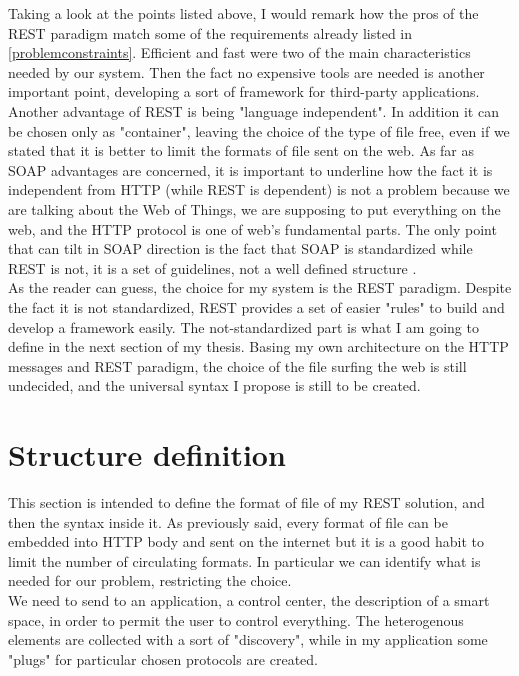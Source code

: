 Taking a look at the points listed above, I would remark how the pros of the REST paradigm match some of the requirements already listed in \ref{problemconstraints}. Efficient and fast were two of the main characteristics needed by our system. Then the fact no expensive tools are needed is another important point, developing a sort of framework for third-party applications. Another advantage of REST is being "language independent". In addition it can be chosen only as "container", leaving the choice of the type of file free, even if we stated that it is better to limit the formats of file sent on the web. As far as SOAP advantages are concerned, it is important to underline how the fact it is independent from HTTP (while REST is dependent) is not a problem because we are talking about the Web of Things, we are supposing to put everything on the web, and the HTTP protocol is one of web's fundamental parts. The only point that can tilt in SOAP direction is the fact that SOAP is standardized while REST is not, it is a set of guidelines, not a well defined structure \cite{pautasso2008restful}.\\
As the reader can guess, the choice for my system is the REST paradigm. Despite the fact it is not standardized, REST provides a set of easier "rules" to build and develop a framework easily. The not-standardized part is what I am going to define in the next section of my thesis. Basing my own architecture on the HTTP messages and REST paradigm, the choice of the file surfing the web is still undecided, and the universal syntax I propose is still to be created.


\section{Structure definition}
This section is intended to define the format of file of my REST solution, and then the syntax inside it. As previously said, every format of file can be embedded into HTTP body and sent on the internet but it is a good habit to limit the number of circulating formats. In particular we can identify what is needed for our problem, restricting the choice. \\
We need to send to an application, a control center, the description of a smart space, in order to permit the user to control everything. The heterogenous elements are collected with a sort of "discovery", while in my application some "plugs" for particular chosen protocols are created. \\

